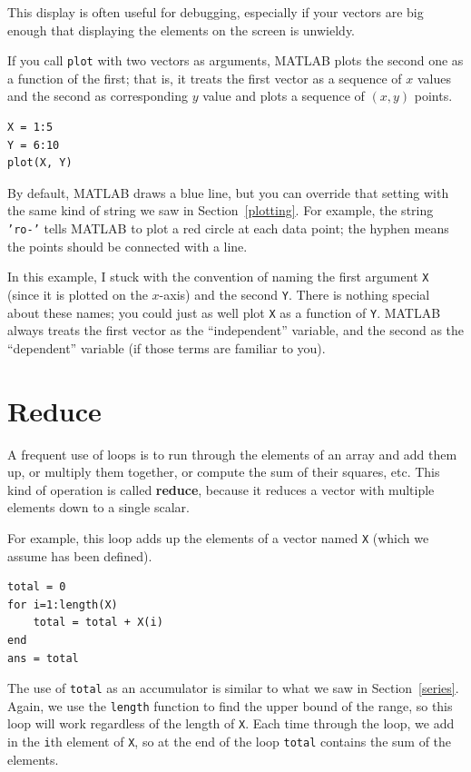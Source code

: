 \documentclass{book}
\begin{document}
This display is often useful for debugging, especially
if your vectors are big enough that displaying the elements on
the screen is unwieldy.

If you call {\tt plot} with two vectors as arguments, MATLAB plots
the second one as a function of the first; that is, it treats
the first vector as a sequence of $x$ values and the second as
corresponding $y$ value and plots a sequence of $(x, y)$ points.

\begin{verbatim}
X = 1:5
Y = 6:10
plot(X, Y)
\end{verbatim}

By default, MATLAB draws a blue line, but you can override that
setting with the same kind of string we saw in Section~\ref{plotting}.
For example, the string {\tt 'ro-'} tells MATLAB to plot a red circle
at each data point; the hyphen means the points should be connected
with a line.

In this example, I stuck with the convention of naming the first
argument {\tt X} (since it is plotted on the $x$-axis) and the
second {\tt Y}.  There is nothing special about these names;
you could just as well plot {\tt X} as a function of {\tt Y}.
MATLAB always treats the first vector as the ``independent''
variable, and the second as the ``dependent'' variable (if those
terms are familiar to you).



\section{Reduce}
\label{reduce}

A frequent use of loops is to run through the elements of an array
and add them up, or multiply them together, or compute the sum
of their squares, etc.  This kind of operation is called {\bf reduce},
because it reduces a vector with multiple elements down to a single
scalar.

For example, this loop adds up the elements of a vector named {\tt X}
(which we assume has been defined).

\begin{verbatim}
total = 0
for i=1:length(X)
    total = total + X(i)
end
ans = total
\end{verbatim}

The use of {\tt total} as an accumulator is similar to what we
saw in Section~\ref{series}.  Again, we use the {\tt length} function
to find the upper bound of the range, so this loop will work
regardless of the length of {\tt X}.
Each time through the loop, we add
in the {\tt i}th element of {\tt X}, so at the end of the loop
{\tt total} contains the sum of the elements.
\end{document}
